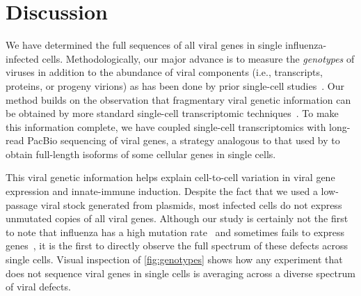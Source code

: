 \documentclass[]{asm-article}
\newcommand{\FIG}[1]{\autoref{fig:#1}}
\begin{document}
\section{Discussion}
We have determined the full sequences of all viral genes in single influenza-infected cells.
Methodologically, our major advance is to measure the \emph{genotypes} of viruses in addition to the abundance of viral components (i.e., transcripts, proteins, or progeny virions) as has been done by prior single-cell studies~\cite{russell2018extreme, steuerman2018dissection, heldt2015single, wang2018cell, sjaastad2018distinct, brooke2013most, zanini2018single, zanini2018virus, saikia2018simultaneous, oneal2018west, zhu2009growth, schulte2014single, akpinar2016high}.
Our method builds on the observation that fragmentary viral genetic information can be obtained by more standard single-cell transcriptomic techniques~\cite{wang2018cell, zanini2018virus, saikia2018simultaneous}.
To make this information complete, we have coupled single-cell transcriptomics with long-read PacBio sequencing of viral genes, a strategy analogous to that used by \cite{gupta2018single} to obtain full-length isoforms of some cellular genes in single cells.

This viral genetic information helps explain cell-to-cell variation in viral gene expression and innate-immune induction.
Despite the fact that we used a low-passage viral stock generated from plasmids, most infected cells do not express unmutated copies of all viral genes.
Although our study is certainly not the first to note that influenza has a high mutation rate~\cite{parvin1986measurement, suarez1992heterogeneity, suarez1994estimation, bloom2014experimentally, pauly2017novel} and sometimes fails to express genes~\cite{russell2018extreme, heldt2015single, brooke2013most, dou2017analysis, jacobs2019incomplete}, it is the first to directly observe the full spectrum of these defects across single cells.
Visual inspection of \FIG{genotypes} shows how any experiment that does not sequence viral genes in single cells is averaging across a diverse spectrum of viral defects.
\end{document}
